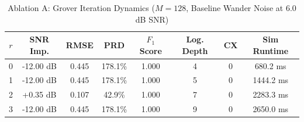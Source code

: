 \begin{table}[t]
\centering
\caption{Ablation A: Grover Iteration Dynamics ($M=128$, Baseline Wander Noise at 6.0 dB SNR)}
\label{tab:ablation_grover}
\begin{tabular}{cccccccc}
\hline
\textbf{$r$} & \textbf{SNR Imp.} & \textbf{RMSE} & \textbf{PRD} & \textbf{$F_1$ Score} & \textbf{Log. Depth} & \textbf{CX} & \textbf{Sim Runtime} \\
\hline
0 & -12.00 dB & 0.445 & 178.1\% & 1.000 & 4 & 0 & 680.2 ms \\
1 & -12.00 dB & 0.445 & 178.1\% & 1.000 & 5 & 0 & 1444.2 ms \\
2 & +0.35 dB & 0.107 & 42.9\% & 1.000 & 7 & 0 & 2283.3 ms \\
3 & -12.00 dB & 0.445 & 178.1\% & 1.000 & 9 & 0 & 2650.0 ms \\
\hline
\end{tabular}
\end{table}
